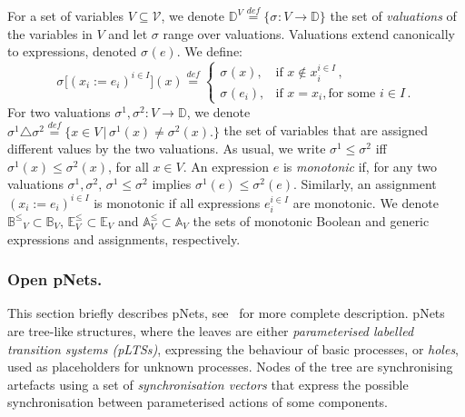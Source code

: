 \documentclass{llncs}
\newcommand{\Ludo}{\\\hfill\mdash Ludo}
\newcommand{\noteLH}[2][color=orange!40, size=\tiny]{\todo[#1]{{#2}\Ludo}}
\newcommand{\add}[2][Added]{\todo[color=blue!20, size=\tiny]{#1}{\color{blue}#2}}
\newcommand{\addSB}[1]{\add[Added by Simon]{#1}}
\newcommand{\sA}{\ensuremath{\mathbb{A}}}
\newcommand{\sB}{\ensuremath{\mathbb{B}}}
\newcommand{\sD}{\ensuremath{\mathbb{D}}}
\newcommand{\sE}{\ensuremath{\mathbb{E}}}
\newcommand{\cV}{\ensuremath{\mathcal{V}}}
\newcommand{\mdash}[1][]{---#1}
\newcommand{\bydef}[1]{\ensuremath{\stackrel{\mathit{\scriptscriptstyle def}}{#1}}}
\newcommand{\bsetdef}[2]{\ensuremath{\bigl\{{#1}\,\bigl|\,{#2}\bigr.\bigr\}}}
\newcommand{\order}{\leqslant}
\newcommand{\ordbool}{\ensuremath{\sB^{\order}}}
\newcommand{\data}{\ensuremath{\sD}}
\newcommand{\variables}{\ensuremath{\cV}}
\newcommand{\exprs}[1]{\ensuremath{\sE_{#1}}}
\newcommand{\monexprs}[1]{\ensuremath{\sE^{\order}_{#1}}}
\newcommand{\boolexprs}[1]{\ensuremath{\sB_{#1}}}
\newcommand{\guards}[1]{\ensuremath{\ordbool_{#1}}}
\newcommand{\assigns}[1]{\ensuremath{\sA_{#1}}}
\newcommand{\updates}[1]{\ensuremath{\sA^{\order}_{#1}}}
\newcommand{\valuations}[1]{\ensuremath{\data^{#1}}}
\newcommand{\val}[3][]{\ensuremath{#1{\sigma}^{#2}_{#3}}}
\newcommand{\valdiff}[2]{\ensuremath{#1 \triangle #2}}
\begin{document}
For a set of variables $V \subseteq \variables$, we denote
$\valuations{V} \bydef{=} \{\val{}{}: V \rightarrow \data\}$
the set of \emph{valuations} of the variables in $V$ and let $\sigma$ range over valuations.
Valuations extend canonically to expressions, denoted $\val{}{}(e)$. We define:
\[
\val{}{}\bigl[(x_i := e_i)^{i \in I}\bigr](x) \bydef{=}
\begin{cases}
  \val{}{}(x), & \text{if } x \not\in x_i^{i \in I}\,,\\
  \val{}{}(e_i), & \text{if } x = x_i, \text{for some } i \in I\,.
\end{cases}%
\]
For two valuations $\val{1}{}, \val{2}{} : V \rightarrow
\data$, we denote $\valdiff{\val{1}{}}{\val{2}{}} \bydef{=}
\bsetdef{x \in V}{\val{1}{}(x) \neq \val{2}{}(x)}$ the set of
variables that are assigned different values by the two
valuations.  As usual, we write $\val{1}{} \order \val{2}{}$
iff $\val{1}{}(x) \order \val{2}{}(x)$, for all $x \in V$.  An
expression $e$ is  \emph{monotonic} if, for
any two valuations $\val{1}{}, \val{2}{}$,
$\val{1}{} \order \val{2}{}$ implies $\val{1}{}(e) \order
\val{2}{}(e)$.
%
Similarly, an assignment $(x_i := e_i)^{i \in I} $ is
 monotonic if all expressions $e_i^{i \in I}$ are monotonic.
We  denote $\guards{V} \subset \boolexprs{V}$, $\monexprs{V}
\subset \exprs{V}$ and $\updates{V} \subset \assigns{V}$ the sets of
monotonic Boolean and generic expressions and assignments,
respectively.
%

\subsubsection{Open pNets.}
\label{secn:pNets}
This section briefly describes pNets, see~\cite{HMZ-FORTE2016} for more complete   description.
pNets are tree-like structures, where the leaves are either
\emph{parameterised labelled transition systems (pLTSs)}, expressing the
behaviour of basic processes, or \emph{holes}, used as placeholders
for unknown processes.
Nodes of the tree are synchronising artefacts using a
set of \emph{synchronisation vectors} that express the possible
synchronisation between  parameterised actions of some components.
\end{document}
